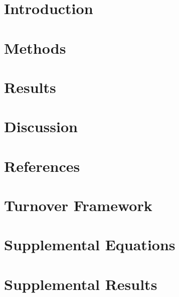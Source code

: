 \documentclass[review,3p,authoryear]{elsarticle}
\begin{document}

\section{Introduction}\label{s:intro}

\section{Methods}\label{s:methods}

\section{Results}\label{s:results}

\section{Discussion}\label{s:discussion}

\clearpage

\clearpage
\section*{References}

\clearpage
\initappendix
\section{Turnover Framework}\label{a:framework}
\clearpage
\section{Supplemental Equations}\label{a:eqs}

\clearpage
\section{Supplemental Results}\label{a:results}

\clearpage
\end{document}
